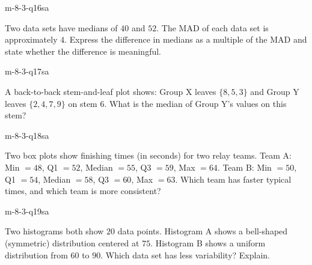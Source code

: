 
\begin{practiceQuestion}{m-8-3-q16}{sa}
\begin{questionText}
Two data sets have medians of $40$ and $52$. The MAD of each data set is approximately $4$. Express the difference in medians as a multiple of the MAD and state whether the difference is meaningful.
\end{questionText}
\end{practiceQuestion}

\begin{practiceQuestion}{m-8-3-q17}{sa}
\begin{questionText}
A back-to-back stem-and-leaf plot shows: Group X leaves $\{8, 5, 3\}$ and Group Y leaves $\{2, 4, 7, 9\}$ on stem $6$. What is the median of Group Y's values on this stem?
\end{questionText}
\end{practiceQuestion}

\begin{practiceQuestion}{m-8-3-q18}{sa}
\begin{questionText}
Two box plots show finishing times (in seconds) for two relay teams. Team A: Min $= 48$, Q1 $= 52$, Median $= 55$, Q3 $= 59$, Max $= 64$. Team B: Min $= 50$, Q1 $= 54$, Median $= 58$, Q3 $= 60$, Max $= 63$. Which team has faster typical times, and which team is more consistent?
\end{questionText}
\end{practiceQuestion}

\begin{practiceQuestion}{m-8-3-q19}{sa}
\begin{questionText}
Two histograms both show $20$ data points. Histogram A shows a bell-shaped (symmetric) distribution centered at $75$. Histogram B shows a uniform distribution from $60$ to $90$. Which data set has less variability? Explain.
\end{questionText}
\end{practiceQuestion}

